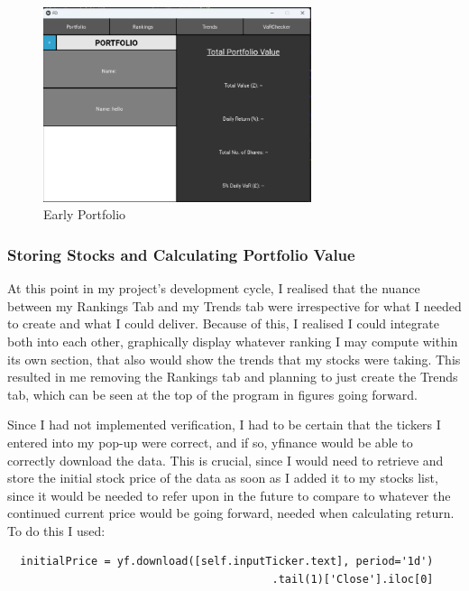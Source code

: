 \documentclass{article}
\begin{document}
\begin{figure}[h]
  \centering
  \includegraphics[width=0.7\textwidth]{Images/Term 2 Images/image (16).png}
  \caption{Early Portfolio}
  \label{fig:Early Portfolio}
\end{figure}

\subsubsection{Storing Stocks and Calculating Portfolio Value}
At this point in my project's development cycle, I realised that the nuance between my Rankings Tab and my Trends tab were irrespective for what I needed to create and what I could deliver. Because of this, I realised I could integrate both into each other, graphically display whatever ranking I may compute within its own section, that also would show the trends that my stocks were taking. This resulted in me removing the Rankings tab and planning to just create the Trends tab, which can be seen at the top of the program in figures going forward.\\\vspace{0.3cm}

Since I had not implemented verification, I had to be certain that the tickers I entered into my pop-up were correct, and if so, yfinance would be able to correctly download the data. This is crucial, since I would need to retrieve and store the initial stock price of the data as soon as I added it to my stocks list, since it would be needed to refer upon in the future to compare to whatever the continued current price would be going forward, needed when calculating return. To do this I used:\\\vspace{0.3cm}

\begin{verbatim}
  initialPrice = yf.download([self.inputTicker.text], period='1d')
                                         .tail(1)['Close'].iloc[0]
\end{verbatim}
\end{document}
